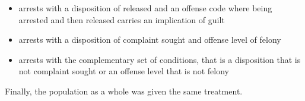 \documentclass[]{article}
\providecommand{\tightlist}{%
  \setlength{\itemsep}{0pt}\setlength{\parskip}{0pt}}
\begin{document}
\begin{itemize}
\tightlist
\item
  arrests with a disposition of released and an offense code where being
  arrested and then released carries an implication of guilt
\item
  arrests with a disposition of complaint sought and offense level of
  felony
\item
  arrests with the complementary set of conditions, that is a
  disposition that is not complaint sought or an offense level that is
  not felony
\end{itemize}

Finally, the population as a whole was given the same treatment.
\end{document}
